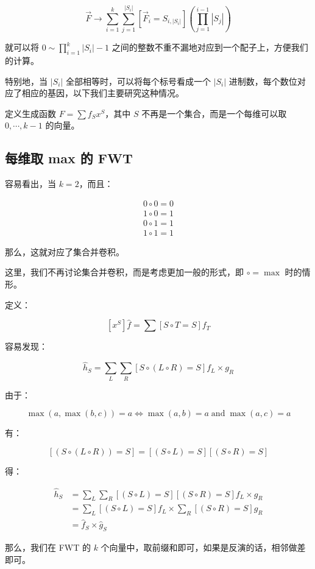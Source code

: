 \documentclass[12pt]{article} %
\begin{document}
$$\vec F \to \sum_{i=1}^k \sum_{j=1}^{|S_i|} [\vec F_i = S_{i,|S_i|}](\prod_{j=1}^{i-1}|S_j|)$$

就可以将 $0 \sim \prod_{i=1}^k |S_i|-1$ 之间的整数不重不漏地对应到一个配子上，方便我们的计算。

特别地，当 $|S_i|$ 全部相等时，可以将每个标号看成一个 $|S_i|$ 进制数，每个数位对应了相应的基因，以下我们主要研究这种情况。

定义生成函数 $F=\sum f_S x^S$，其中 $S$ 不再是一个集合，而是一个每维可以取 $0,\cdots ,k-1$ 的向量。

\subsection{每维取 max 的 FWT}

容易看出，当 $k=2$，而且：

$$\begin{aligned}0 \circ 0 = 0 \\ 1 \circ 0 = 1 \\ 0 \circ 1 = 1 \\ 1 \circ 1 = 1\end{aligned}$$

那么，这就对应了集合并卷积。

这里，我们不再讨论集合并卷积，而是考虑更加一般的形式，即 $\circ = \max$ 时的情形。

定义：

$$[x^S]\hat f=\sum[S \circ T=S] f_T$$

容易发现：

$$\hat h_S=\sum_{L}\sum_{R}[S \circ (L \circ R) = S] f_L \times g_R$$

由于：

$$\max(a,\max(b,c))=a \Leftrightarrow \max(a,b)=a \operatorname{and} \max(a,c)=a$$

有：

$$[(S \circ (L \circ R))=S]=[(S \circ L) =S][(S \circ R)=S]$$

得：

$$\begin{aligned} \hat h_S &= \sum_{L} \sum_{R} [(S \circ L) =S][(S \circ R)=S] f_L \times g_R \\ &= \sum_{L} [(S \circ L)=S] f_L \times \sum_{R} [(S \circ R)=S] g_R \\ &= \hat f_S \times \hat g_S\end{aligned}$$


那么，我们在 FWT 的 $k$ 个向量中，取前缀和即可，如果是反演的话，相邻做差即可。
\end{document}
